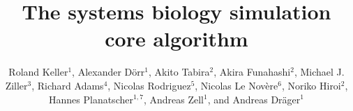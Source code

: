 \documentclass[10pt]{bmc_article}
\newenvironment{bmcformat}{\fussy\setboolean{publ}{true}}{\fussy}
\begin{document}
\begin{bmcformat}



\title{The systems biology simulation core algorithm}



\author{%
Roland Keller$^{1}$, %
Alexander D\"orr$^{1}$, %
Akito Tabira$^{2}$, %
Akira Funahashi$^{2}$, %
Michael J. Ziller$^{3}$, %
Richard Adams$^{4}$, %
Nicolas Rodriguez$^{5}$, %
Nicolas Le Nov\`{e}re$^{6}$, %
Noriko Hiroi$^{2}$,%
Hannes Planatscher$^{1,7}$, %
Andreas Zell$^{1}$, %
and Andreas Dr\"ager$^{1}$\correspondingauthor{}%
}


\address{%
\iid(1)Center for Bioinformatics Tuebingen (ZBIT), University of
Tuebingen, T\"ubingen, Germany
\iid(2)Keio University, Graduate School of
Science and Technology, Yokohama, Japan 
\iid(3)Department of Stem Cell and Regenerative Biology, Harvard University,
Cambridge, MA, USA
\iid(4)SynthSys Edinburgh, CH Waddington Building, University of Edinburgh,
Edinburgh EH9 3JD, UK
\iid(5)European Bioinformatics Institute, Wellcome Trust Genome Campus, Hinxton,
Cambridge, UK
\iid(6)Babraham Institute, Babraham, Cambridge, UK
\iid(7)Present address: Natural and Medical Sciences Institute at the University of Tuebingen,
Reutlingen, Germany}


\end{bmcformat}
\end{document}
